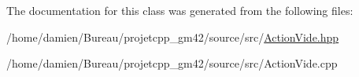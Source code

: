 The documentation for this class was generated from the following files\-:\begin{DoxyCompactItemize}
\item 
/home/damien/\-Bureau/projetcpp\-\_\-gm42/source/src/\hyperlink{ActionVide_8hpp}{Action\-Vide.\-hpp}\item 
/home/damien/\-Bureau/projetcpp\-\_\-gm42/source/src/Action\-Vide.\-cpp\end{DoxyCompactItemize}
